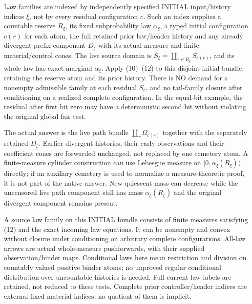 \documentclass[11pt]{article}
\begin{document}
Law families are indexed by independently specified INITIAL input/history indices $\xi$, not by every residual configuration $c$. Such an index supplies a countable reserve $R_\xi$, its fixed subprobability law $\alpha_\xi$, a typed initial configuration $c(r)$ for each atom, the full retained prior law/header history and any already divergent prefix component $D_\xi$ with its actual measure and finite material/control cones. The live source domain is $S_\xi=\coprod_{r\in R_\xi}S_{c(r)}$, and its whole law has exact marginal $\alpha_\xi$. Apply (10)--(12) to this disjoint initial bundle, retaining the reserve atom and its prior history. There is NO demand for a nonempty admissible family at each residual $S_c$, and no tail-family closure after conditioning on a realized complete configuration. In the equal-bit example, the residual after first bit zero may have a deterministic second bit without violating the original global fair test.

The actual answer is the live path bundle $\coprod_r\Omega_{c(r)}$ together with the separately retained $D_\xi$. Earlier divergent histories, their early observations and their coefficient cones are forwarded unchanged, not replaced by one cemetery atom. A finite-measure cylinder construction can use Lebesgue measure on $[0,\alpha_\xi(R_\xi))$ directly; if an auxiliary cemetery is used to normalize a measure-theoretic proof, it is not part of the native answer. New quiescent mass can decrease while the uncensored live path component still has mass $\alpha_\xi(R_\xi)$ and the original divergent component remains present.

A source law family on this INITIAL bundle consists of finite measures satisfying (12) and the exact incoming law equations. It can be nonempty and convex without closure under conditioning on arbitrary complete configurations. All-law arrows are actual whole-measure pushforwards, with their supplied observation/binder maps. Conditional laws here mean restriction and division on countably valued positive binder atoms; no unproved regular conditional distribution over uncountable histories is needed. Full current law labels are retained, not reduced to these tests. Complete prior controller/header indices are external fixed material indices; no quotient of them is implicit.
\end{document}
